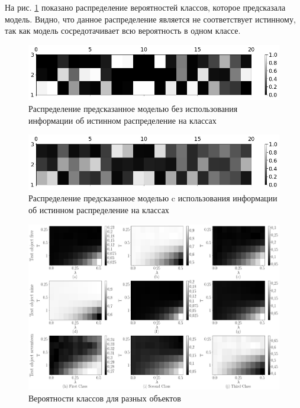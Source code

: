 На рис. \ref{fg:ex:synt:distr:without} показано распределение вероятностей классов, которое предсказала модель. Видно, что данное распределение является не соответствует истинному, так как модель сосредотачивает всю вероятность в одном классе.

\begin{figure}[h!t]\center
\includegraphics[width=1\textwidth]{results/privlearn/syn_without_teacher_distr}
\caption{Распределение предсказанное моделью без использования информации об истинном распределение на классах}
\label{fg:ex:synt:distr:without}
\end{figure}

\begin{figure}[h!t]\center
\includegraphics[width=1\textwidth]{results/privlearn/syn_with_teacher_distr}
\caption{Распределение предсказанное моделью c использования информации об истинном распределение на классах}
\label{fg:ex:synt:distr:with}
\end{figure}

\begin{figure}[h!t]\center
\includegraphics[width=1\textwidth]{results/privlearn/syn_T_lambda}
\caption{Вероятности классов для разных объектов}
\label{fg:ex:synt:distr:lambda_T}
\end{figure}

